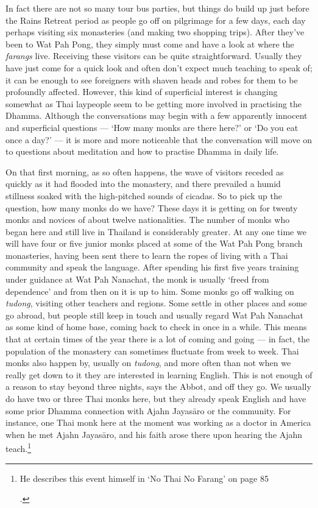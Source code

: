 In fact there are not so many tour bus parties, but things do build up
just before the Rains Retreat period as people go off on pilgrimage for
a few days, each day perhaps visiting six monasteries (and making two
shopping trips). After they've been to Wat Pah Pong, they simply must
come and have a look at where the \emph{farangs} live. Receiving these
visitors can be quite straightforward. Usually they have just come for a
quick look and often don't expect much teaching to speak of; it can be
enough to see foreigners with shaven heads and robes for them to be
profoundly affected. However, this kind of superficial interest is
changing somewhat as Thai laypeople seem to be getting more involved in
practising the Dhamma. Although the conversations may begin with a few
apparently innocent and superficial questions --- `How many monks are
there here?' or `Do you eat once a day?' --- it is more and more
noticeable that the conversation will move on to questions about
meditation and how to practise Dhamma in daily life.

On that first morning, as so often happens, the wave of visitors receded
as quickly as it had flooded into the monastery, and there prevailed a
humid stillness soaked with the high-pitched sounds of cicadas. So to
pick up the question, how many monks do we have? These days it is
getting on for twenty monks and novices of about twelve nationalities.
The number of monks who began here and still live in Thailand is
considerably greater. At any one time we will have four or five junior
monks placed at some of the Wat Pah Pong branch monasteries, having been
sent there to learn the ropes of living with a Thai community and speak
the language. After spending his first five years training under
guidance at Wat Pah Nanachat, the monk is usually `freed from
dependence' and from then on it is up to him. Some monks go off walking
on \emph{tudong}, visiting other teachers and regions. Some settle in
other places and some go abroad, but people still keep in touch and
usually regard Wat Pah Nanachat as some kind of home base, coming back
to check in once in a while. This means that at certain times of the
year there is a lot of coming and going --- in fact, the population of
the monastery can sometimes fluctuate from week to week. Thai monks also
happen by, usually on \emph{tudong}, and more often than not when we
really get down to it they are interested in learning English. This is
not enough of a reason to stay beyond three nights, says the Abbot, and
off they go. We usually do have two or three Thai monks here, but they
already speak English and have some prior Dhamma connection with Ajahn
Jayasāro or the community. For instance, one Thai monk here at the
moment was working as a doctor in America when he met Ajahn Jayasāro,
and his faith arose there upon hearing the Ajahn teach.\footnote{He
  describes this event himself in `No Thai No Farang' on page 85

  .}

